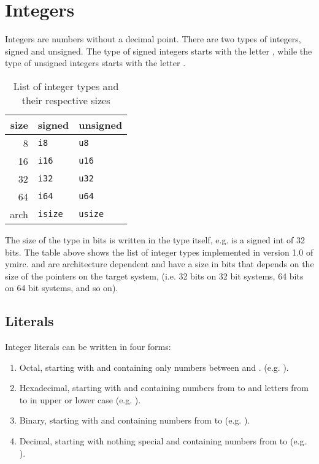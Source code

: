 \section{Integers}
\label{sec:(chap3):integers}

Integers are numbers without a decimal point. There are two types of integers,
signed and unsigned. The type of signed integers starts with the letter
, while the type of unsigned integers starts with the letter
.

\begin{table}[h]
  \centering
  \begin{tabular}{|r|ll|}
    \hline
    size & signed & unsigned\\[0pt]
    \hline
    \hline
    8 & \texttt{i8} & \texttt{u8}\\[0pt]
    16 & \texttt{i16} & \texttt{u16}\\[0pt]
    32 & \texttt{i32} & \texttt{u32}\\[0pt]
    64 & \texttt{i64} & \texttt{u64}\\[0pt]
    arch & \texttt{isize} & \texttt{usize}\\[0pt]
    \hline
  \end{tabular}
  \caption{\label{tab:(chap3):integer_types} List of integer types and their respective sizes}
\end{table}

The size of the type in bits is written in the type itself, e.g.  is
a signed int of 32 bits. The table above shows the list of integer types
implemented in version 1.0 of ymirc.  and  are
architecture dependent and have a size in bits that depends on the size of the
pointers on the target system, (i.e. 32 bits on 32 bit systems, 64 bits on 64
bit systems, and so on).



\subsection{Literals}
\label{sec:org2cf045d}

Integer literals can be written in four forms:

\begin{enumerate}
  \setlength\itemsep{-4pt}
\item Octal, starting with  and containing only numbers between  and . (e.g. ).
\item Hexadecimal, starting with  and containing numbers from
   to  and letters from  to  in upper or
  lower case (e.g. ).
\item Binary, starting with  and containing numbers from  to
   (e.g. ).
\item Decimal, starting with nothing special and containing numbers from
   to  (e.g. ).
\end{enumerate}


